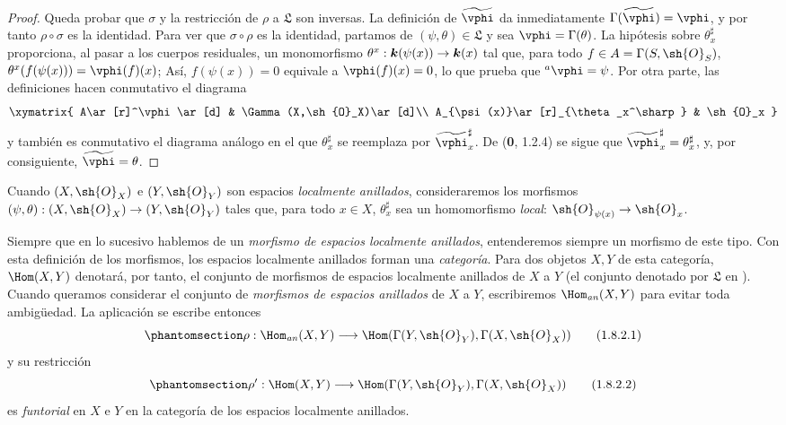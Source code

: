 \documentclass[oneside,10pt]{amsart}
\makeatletter
\newcommand{\ega@arrow}[2]{\mathchoice{#1}{#2}{#2}{#2}}
\renewcommand{\to}{\ega@arrow{\longrightarrow}{\rightarrow}}
\newcommand{\oldpage}[2][]{\marginnote{\normalfont\footnotesize\textbf{#1}~|~#2}\ignorespaces}
\let\EGAOriginalLabel\label
\renewcommand{\label}[1]{\phantomsection\EGAOriginalLabel{#1}}
\makeatother
\begin{document}
\begin{proof}
Queda probar que $\sigma$ y la restricción de $\rho$ a $\mathfrak L$
son inversas. La definición de $\widetilde{\vphi}$ da inmediatamente
$\Gamma(\widetilde{\vphi})=\vphi$, y por tanto $\rho\circ\sigma$ es la
identidad. Para ver que $\sigma\circ\rho$ es la identidad, partamos de
$(\psi,\theta)\in\mathfrak L$ y sea $\vphi=\Gamma(\theta)$. La
hipótesis sobre $\theta_x^\sharp$ proporciona, al pasar a los cuerpos
residuales, un monomorfismo
$\theta^x:\boldsymbol{k}(\psi(x))\to\boldsymbol{k}(x)$
tal que, para todo $f\in A=\Gamma(S,\sh{O}_S)$,
$\theta^x(f(\psi(x)))=\vphi(f)(x)$;
Así, $f(\psi(x))=0$ equivale a $\vphi(f)(x)=0$, lo que prueba que
${}^a\vphi=\psi$. Por otra parte, las definiciones hacen conmutativo
el diagrama
\[
  \xymatrix{
    A\ar[r]^\vphi\ar[d] &
    \Gamma(X,\sh{O}_X)\ar[d]\\
    A_{\psi(x)}\ar[r]_{\theta_x^\sharp} &
    \sh{O}_x
  }
\]
y también es conmutativo el diagrama análogo en el que
$\theta_x^\sharp$ se reemplaza por $\widetilde{\vphi}_x^\sharp$. De
(\textbf 0, 1.2.4) se sigue que
$\widetilde{\vphi}_x^\sharp=\theta_x^\sharp$, y, por consiguiente,
$\widetilde{\vphi}=\theta$.
\end{proof}

\begin{env}[1.8.2]
\label{ega2:addendum:I.1.8.2-fr}
Cuando $(X,\sh{O}_X)$ e $(Y,\sh{O}_Y)$ son espacios \emph{localmente
anillados}, consideraremos los morfismos
$(\psi,\theta):(X,\sh{O}_X)\to(Y,\sh{O}_Y)$ tales que, para todo
$x\in X$, $\theta_x^\sharp$ sea un homomorfismo \emph{local}: $\sh{O}_{\psi(x)}\to\sh{O}_x$.

Siempre que en lo sucesivo hablemos de un
\oldpage[II]{219}
\emph{morfismo de espacios localmente anillados}, entenderemos siempre
un morfismo de este tipo. Con esta definición de los morfismos, los
espacios localmente anillados forman una \emph{categoría}. Para dos objetos
$X,Y$ de esta categoría, $\Hom(X,Y)$ denotará, por tanto, el conjunto
de morfismos de espacios localmente anillados de $X$ a $Y$ (el
conjunto denotado por $\mathfrak L$ en ). Cuando queramos
considerar el conjunto de \emph{morfismos de espacios anillados} de $X$ a
$Y$, escribiremos $\Hom_{\mathit{an}}(X,Y)$ para evitar toda
ambigüedad. La aplicación  se escribe entonces
\begin{equation}
\label{ega2:addendum:I.1.8.2.1-fr}
  \rho:\Hom_{\mathit{an}}(X,Y)
  \to\Hom(\Gamma(Y,\sh{O}_Y),\Gamma(X,\sh{O}_X))
\tag{1.8.2.1}
\end{equation}
y su restricción
\begin{equation}
\label{ega2:addendum:I.1.8.2.2-fr}
  \rho':\Hom(X,Y)
  \to\Hom(\Gamma(Y,\sh{O}_Y),\Gamma(X,\sh{O}_X))
\tag{1.8.2.2}
\end{equation}
es \emph{funtorial} en $X$ e $Y$ en la categoría de los espacios localmente
anillados.
\end{env}
\end{document}
